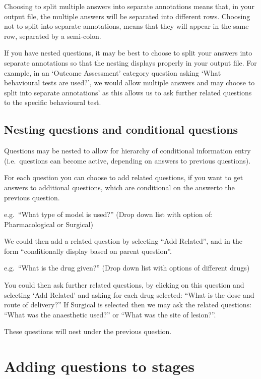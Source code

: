 \documentclass[
]{book}
\begin{document}
Choosing to split multiple answers into separate annotations means that, in your output file, the multiple answers will be separated into different rows. Choosing not to split into separate annotations, means that they will appear in the same row, separated by a semi-colon.

If you have nested questions, it may be best to choose to split your answers into separate annotations so that the nesting displays properly in your output file. For example, in an `Outcome Assessment' category question asking `What behavioural tests are used?', we would allow multiple answers and may choose to split into separate annotations' as this allows us to ask further related questions to the specific behavioural test.

\hypertarget{nesting-questions-and-conditional-questions}{%
\subsection{Nesting questions and conditional questions}\label{nesting-questions-and-conditional-questions}}

Questions may be nested to allow for hierarchy of conditional information entry (i.e.~questions can become active, depending on answers to previous questions).

For each question you can choose to add related questions, if you want to get answers to additional questions, which are conditional on the answerto the previous question.

e.g.~``What type of model is used?''
(Drop down list with option of: Pharmacological or Surgical)

We could then add a related question by selecting ``Add Related'', and in the form ``conditionally display based on parent question''.

e.g.~``What is the drug given?''
(Drop down list with options of different drugs)

You could then ask further related questions, by clicking on this question and selecting `Add Related' and asking for each drug selected: ``What is the dose and route of delivery?'' If Surgical is selected then we may ask the related questions: ``What was the anaesthetic used?'' or ``What was the site of lesion?''.

These questions will nest under the previous question.

\hypertarget{adding-questions-to-stages}{%
\section{Adding questions to stages}\label{adding-questions-to-stages}}
\end{document}
